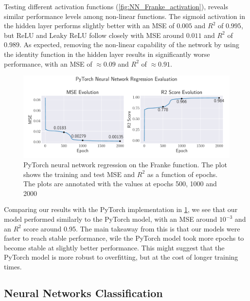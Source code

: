 Testing different activation functions (\cref{fig:NN_Franke_activation}), reveals similar performance levels among non-linear functions. The sigmoid activation in the hidden layer performs slightly better with an MSE of $0.005$ and $R^2$ of $0.995$, but ReLU and Leaky ReLU follow closely with MSE around $0.011$ and $R^2$ of $0.989$. As expected, removing the non-linear capability of the network by using the identity function in the hidden layer results in significantly worse performance, with an MSE of $\approx 0.09$ and $R^2$ of $\approx0.91$.

\onecolumngrid
\begin{figure}[ht!]
    \centering
    \includegraphics[width = .9\textwidth]{../figs/nn_torch_franke.pdf}
    \caption{PyTorch neural network regression on the Franke function. The plot shows the training and test MSE and \( R^2 \) as a function of epochs. The plots are annotated with the values at epochs 500, 1000 and 2000}
    \label{fig:NN_Torch_scores}
\end{figure}
\twocolumngrid

Comparing our results with the PyTorch implementation in \cref{fig:NN_Torch_scores}, we see that our model performed similarly to the PyTorch model, with an MSE around \( 10^{-3} \) and an \( R^2 \) score around 0.95. The main takeaway from this is that our models were faster to reach stable performance, wile the PyTorch model took more epochs to become stable at slightly better performance. This might suggest that the PyTorch model is more robust to overfitting, but at the cost of longer training times.

\clearpage

\subsection{Neural Networks Classification}

